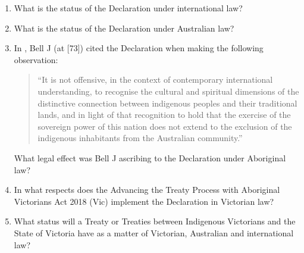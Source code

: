 \begin{tutorialquestion}
    \begin{enumerate}
        \item What is the status of the Declaration under international law?
        \item What is the status of the Declaration under Australian law?
        \item In , Bell J (at [73]) cited the Declaration when making the following observation:
        \begin{quote}
            ``It is not offensive, in the context of contemporary international understanding, to recognise the cultural and spiritual dimensions of the distinctive connection between indigenous peoples and their traditional lands, and in light of that recognition to hold that the exercise of the sovereign power of this nation does not extend to the exclusion of the indigenous inhabitants from the Australian community.''
        \end{quote}

        What legal effect was Bell J ascribing to the Declaration under Aboriginal law?
        \item In what respects does the Advancing the Treaty Process with Aboriginal Victorians Act 2018 (Vic) implement the Declaration in Victorian law?
        \item What status will a Treaty or Treaties between Indigenous Victorians and the State of Victoria have as a matter of Victorian, Australian and international law?
    \end{enumerate}
\end{tutorialquestion}

